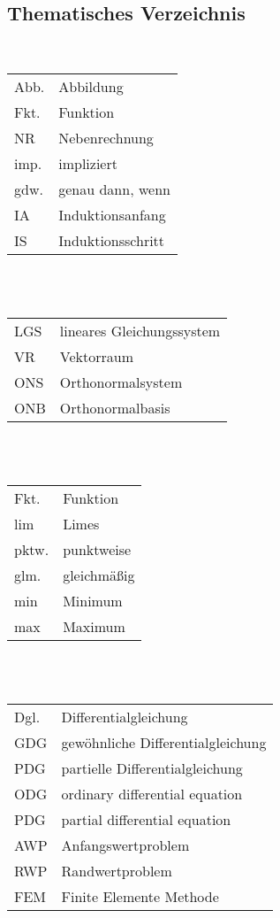 \subsection{Thematisches Verzeichnis}
\\[2pt]
\begin{tabular}{ll}
Abb. & Abbildung\\
Fkt. & Funktion\\
NR & Nebenrechnung\\
imp. & impliziert\\
gdw. & genau dann, wenn\\
IA & Induktionsanfang\\
IS & Induktionsschritt
\end{tabular}\\[4pt]
\\[2pt]
\begin{tabular}{ll}
LGS & lineares Gleichungssystem\\
VR & Vektorraum\\
ONS & Orthonormalsystem\\
ONB & Orthonormalbasis
\end{tabular}\\[4pt]
\\[2pt]
\begin{tabular}{ll}
Fkt. & Funktion\\
lim & Limes\\
pktw. & punktweise\\
glm. & gleichmäßig\\
min & Minimum\\
max & Maximum
\end{tabular}\\[4pt]
\\[2pt]
\begin{tabular}{ll}
Dgl. & Differentialgleichung\\
GDG & gewöhnliche Differentialgleichung\\
PDG & partielle Differentialgleichung\\
ODG & ordinary differential equation\\
PDG & partial differential equation\\
AWP & Anfangswertproblem\\
RWP & Randwertproblem\\
FEM & Finite Elemente Methode
\end{tabular}\\[4pt]
